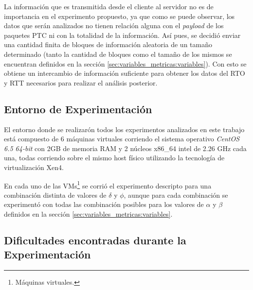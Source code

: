 \par La informaci\'on que es transmitida desde el cliente al servidor no es
de importancia en el experimento propuesto, ya que como se puede observar, los
datos que ser\'an analizados no tienen relaci\'on alguna con el \emph{payload} de
los paquetes PTC ni con la totalidad de la informaci\'on. As\'i pues, se decidi\'o
enviar una cantidad finita de bloques de informaci\'on aleatoria de un tama\~no determinado
(tanto la cantidad de bloques como el tama\~no de los mismos se encuentran definidos
en la secci\'on \ref{sec:variables_metricas:variables}). Con esto se obtiene
un intercambio de informaci\'on suficiente para obtener los datos del RTO y RTT necesarios
para realizar el an\'alisis posterior.


\subsection{Entorno de Experimentaci\'on}\label{sec:experimento:entorno}
\par El entorno donde se realizar\'on todos los experimentos analizados en este
trabajo est\'a compuesto de 6 m\'aquinas virtuales corriendo el sistema operativo
\textit{CentOS 6.5 64-bit}\cite{centos} con 2GB de memoria RAM y 2 n\'ucleos x86\_64
intel de 2.26 GHz cada una, todas corriendo sobre el mismo host f\'isico
utilizando la tecnolog\'ia de virtualizaci\'on Xen4\cite{xen}.

\par En cada uno de las VMs\footnote{M\'aquinas virtuales.} se corri\'o 
el experimento descripto para una combinaci\'on distinta de valores de
$\delta$ y $\phi$, aunque para cada combinaci\'on se experiment\'o con todas
las combinaci\'on posibles para los valores de $\alpha$ y $\beta$ definidos 
en la secci\'on \ref{sec:variables_metricas:variables}.


\subsection{Dificultades encontradas durante la Experimentaci\'on}\label{sec:experimento:dificultades}



